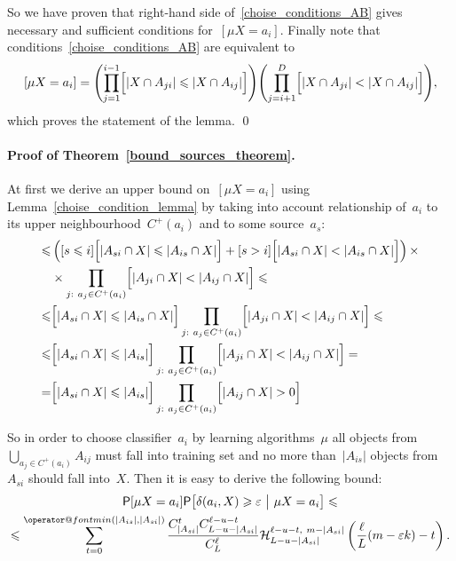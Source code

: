 \documentclass{article}
\makeatletter
\renewcommand{\geq}{\geqslant}
\renewcommand{\leq}{\leqslant}
\renewcommand{\min}{\mathop{\operator@font min}\limits}
\providecommand{\Prob}{\mathsf{P}}
\makeatother
\begin{document}
So we have proven that right-hand side of~\eqref{choise_conditions_AB}
gives necessary and sufficient conditions for~$[\mu X = a_i]$.
Finally note that conditions~\eqref{choise_conditions_AB} are equivalent to
\[
    [\mu X = a_i] =
        \Biggl( \prod_{j = 1}^{i - 1} \Bigl[ |X \cap A_{ji}| \leq |X \cap A_{ij}| \Bigr] \Biggr)
        \Biggl( \prod_{j = i + 1}^{D} \Bigl[ |X \cap A_{ji}| < |X \cap A_{ij}| \Bigr] \Biggr),
\]
which proves the statement of the lemma.
\qed

\paragraph{Proof of Theorem~\ref{bound_sources_theorem}.}
At first we derive an upper bound on~$[\mu X = a_i]$ using Lemma~\ref{choise_condition_lemma}
by taking into account relationship of~$a_i$ to its upper neighbourhood~$C^+(a_i)$
and to some source~$a_s$:
\begin{align*}
    [\mu X = a_i]
    \leq
    &\left(
        [s \leq i]
        \Bigl[|A_{si} \cap X| \leq |A_{is} \cap X| \Bigr]
        +
        [s > i]
        \Bigl[ |A_{si} \cap X| < |A_{is} \cap X| \Bigr]
    \right)
    \times \\
    &\times
    \prod_{j:\ a_j \in C^+(a_i)}
        \Bigl[ |A_{ji} \cap X| < |A_{ij} \cap X| \Bigr] \leq \\
    \leq
    &\Bigl[ |A_{si} \cap X| \leq |A_{is} \cap X| \Bigr]
    \prod_{j:\ a_j \in C^+(a_i)}
        \Bigl[ |A_{ji} \cap X| < |A_{ij} \cap X| \Bigr] \leq \\
    \leq
    &\Bigl[ |A_{si} \cap X| \leq |A_{is}| \Bigr]
    \prod_{j:\ a_j \in C^+(a_i)}
        \Bigl[ |A_{ji} \cap X| < |A_{ij} \cap X| \Bigr]
    = \\
    =
    &\Bigl[ |A_{si} \cap X| \leq |A_{is}| \Bigr]
    \prod_{j:\ a_j \in C^+(a_i)}
        \Bigl[ |A_{ij} \cap X| > 0 \Bigr]
\end{align*}

So in order to choose classifier~$a_i$ by learning algorithms~$\mu$
all objects from $\bigcup_{a_j \in C^+(a_i)} A_{ij}$ must fall into training set
and no more than~$|A_{is}|$ objects from~$A_{si}$ should fall into~$X$.
Then it is easy to derive the following bound:
\begin{multline*}
    \Prob [\mu X = a_i]
    \Prob
        \bigl[
            \delta (a_i, X) \geq \varepsilon
            \ \big|\
            \mu X = a_i
        \bigr]
    \leq \\
    \leq
    \sum_{t = 0}^{\min(|A_{is}|, |A_{si}|)}
        \frac{
            C_{|A_{si}|}^t C_{L - u - |A_{si}|}^{\ell - u - t}
        }{
            C_L^\ell
        }
        \mathcal{H}_{L - u - |A_{si}|}^{\ell - u - t,\ m - |A_{si}|}
        \left(
            \frac{\ell}{L} (m - \varepsilon k) - t
        \right).
\end{multline*}
\end{document}
